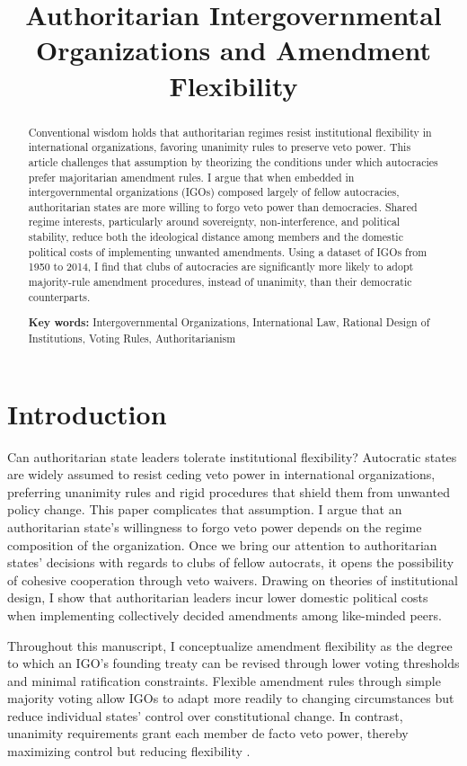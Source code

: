 \documentclass[12pt]{article}
\title{Authoritarian Intergovernmental Organizations and Amendment Flexibility}
\author{}
\date{}
\begin{document}
\maketitle

\begin{abstract}
Conventional wisdom holds that authoritarian regimes resist institutional flexibility in international organizations, favoring unanimity rules to preserve veto power. This article challenges that assumption by theorizing the conditions under which autocracies prefer majoritarian amendment rules. I argue that when embedded in intergovernmental organizations (IGOs) composed largely of fellow autocracies, authoritarian states are more willing to forgo veto power than democracies. Shared regime interests, particularly around sovereignty, non-interference, and political stability, reduce both the ideological distance among members and the domestic political costs of implementing unwanted amendments. Using a dataset of IGOs from 1950 to 2014, I find that clubs of autocracies are significantly more likely to adopt majority-rule amendment procedures, instead of unanimity, than their democratic counterparts.

\medskip
\noindent\textbf{Key words:} Intergovernmental Organizations, International Law, Rational Design of Institutions, Voting Rules, Authoritarianism
\end{abstract}

\newpage

\section{Introduction}

Can authoritarian state leaders tolerate institutional flexibility? Autocratic states are widely assumed to resist ceding veto power in international organizations, preferring unanimity rules and rigid procedures that shield them from unwanted policy change. This paper complicates that assumption. I argue that an authoritarian state's willingness to forgo veto power depends on the regime composition of the organization. Once we bring our attention to authoritarian states' decisions with regards to clubs of fellow autocrats, it opens the possibility of cohesive cooperation through veto waivers. Drawing on theories of institutional design, I show that authoritarian leaders incur lower domestic political costs when implementing collectively decided amendments among like-minded peers.

Throughout this manuscript, I conceptualize amendment flexibility as the degree to which an IGO's founding treaty can be revised through lower voting thresholds and minimal ratification constraints. Flexible amendment rules through simple majority voting allow IGOs to adapt more readily to changing circumstances but reduce individual states' control over constitutional change. In contrast, unanimity requirements grant each member de facto veto power, thereby maximizing control but reducing flexibility \parencite{lutz_toward_1994, ferejohn_politics_nodate}.
\end{document}
